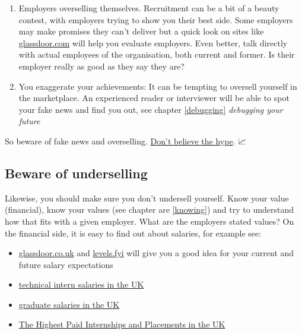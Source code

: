 \documentclass[
]{book}
\providecommand{\tightlist}{%
  \setlength{\itemsep}{0pt}\setlength{\parskip}{0pt}}
\begin{document}
\begin{enumerate}
\def\labelenumi{\arabic{enumi}.}
\tightlist
\item
  Employers overselling themselves. Recruitment can be a bit of a beauty contest, with employers trying to show you their best side. Some employers may make promises they can't deliver but a quick look on sites like \href{https://www.glassdoor.com}{glassdoor.com} will help you evaluate employers. Even better, talk directly with actual employees of the organisation, both current and former. Is their employer really as good as they say they are?
\item
  You exaggerate your achievements: It can be tempting to oversell yourself in the marketplace. An experienced reader or interviewer will be able to spot your fake news and find you out, see chapter \ref{debugging} \emph{debugging your future}
\end{enumerate}

So beware of fake news and overselling. \href{https://en.wikipedia.org/wiki/Don\%27t_Believe_the_Hype}{Don't believe the hype}. \citep{dontbelievethehype} 📈

\hypertarget{undersell}{%
\subsection{Beware of underselling}\label{undersell}}

Likewise, you should make sure you don't undersell yourself. Know your value (financial), know your values (see chapter are \ref{knowing}) and try to understand how that fits with a given employer. What are the employers stated values? On the financial side, it is easy to find out about salaries, for example see:

\begin{itemize}
\tightlist
\item
  \href{https://www.glassdoor.co.uk/}{glassdoor.co.uk} and \href{https://www.levels.fyi/}{levels.fyi} will give you a good idea for your current and future salary expectations
\item
  \href{https://github.com/IgWod/interns-salaries-uk-2018}{technical intern salaries in the UK} \citep{igwod}
\item
  \href{https://luminate.prospects.ac.uk/graduate-salaries-in-the-uk}{graduate salaries in the UK} \citep{michaelgrove}
\item
  \href{https://www.ratemyplacement.co.uk/blog/highest-paid-internships-placements-uk/}{The Highest Paid Internships and Placements in the UK} \citep{louiseintern}
\end{itemize}
\end{document}
